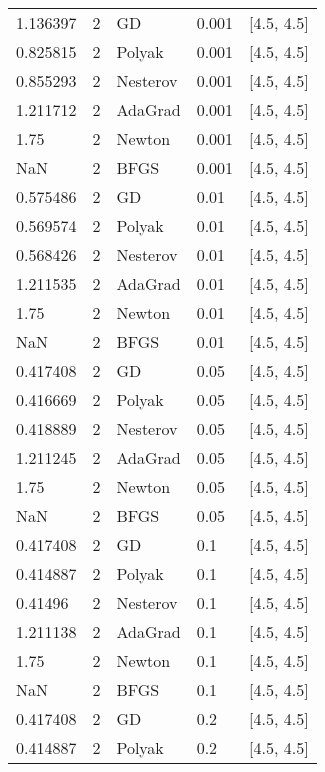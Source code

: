 \begin{tabular}{lllll}
 1.136397 &        2 &       GD &  0.001 &       [4.5, 4.5] \\
 0.825815 &        2 &   Polyak &  0.001 &       [4.5, 4.5] \\
 0.855293 &        2 & Nesterov &  0.001 &       [4.5, 4.5] \\
 1.211712 &        2 &  AdaGrad &  0.001 &       [4.5, 4.5] \\
     1.75 &        2 &   Newton &  0.001 &       [4.5, 4.5] \\
      NaN &        2 &     BFGS &  0.001 &       [4.5, 4.5] \\
 0.575486 &        2 &       GD &   0.01 &       [4.5, 4.5] \\
 0.569574 &        2 &   Polyak &   0.01 &       [4.5, 4.5] \\
 0.568426 &        2 & Nesterov &   0.01 &       [4.5, 4.5] \\
 1.211535 &        2 &  AdaGrad &   0.01 &       [4.5, 4.5] \\
     1.75 &        2 &   Newton &   0.01 &       [4.5, 4.5] \\
      NaN &        2 &     BFGS &   0.01 &       [4.5, 4.5] \\
 0.417408 &        2 &       GD &   0.05 &       [4.5, 4.5] \\
 0.416669 &        2 &   Polyak &   0.05 &       [4.5, 4.5] \\
 0.418889 &        2 & Nesterov &   0.05 &       [4.5, 4.5] \\
 1.211245 &        2 &  AdaGrad &   0.05 &       [4.5, 4.5] \\
     1.75 &        2 &   Newton &   0.05 &       [4.5, 4.5] \\
      NaN &        2 &     BFGS &   0.05 &       [4.5, 4.5] \\
 0.417408 &        2 &       GD &    0.1 &       [4.5, 4.5] \\
 0.414887 &        2 &   Polyak &    0.1 &       [4.5, 4.5] \\
  0.41496 &        2 & Nesterov &    0.1 &       [4.5, 4.5] \\
 1.211138 &        2 &  AdaGrad &    0.1 &       [4.5, 4.5] \\
     1.75 &        2 &   Newton &    0.1 &       [4.5, 4.5] \\
      NaN &        2 &     BFGS &    0.1 &       [4.5, 4.5] \\
 0.417408 &        2 &       GD &    0.2 &       [4.5, 4.5] \\
 0.414887 &        2 &   Polyak &    0.2 &       [4.5, 4.5] \\

\end{tabular}
